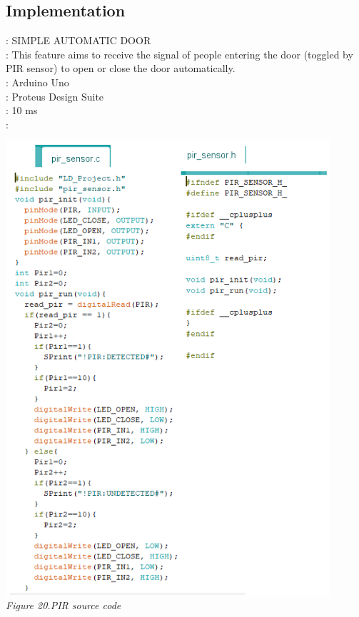 \documentclass[a4paper]{article}
\begin{document}
\subsection{Implementation}
\text{[TOPIC]}: SIMPLE AUTOMATIC DOOR\\
\text{[Description]}: This feature aims to receive the signal of people entering the door (toggled by PIR sensor) to open or close the door automatically.\\
\text{[Board]}: Arduino Uno\\
\text{[Simulation]}: Proteus Design Suite\\
: 10 ms\\
:
\medskip
\begin{center}
    \includegraphics[width=12cm]{pictures/PIR_sensor.png}\\
    \textit{Figure 20.PIR source code}\\
\end{center}
\end{document}
